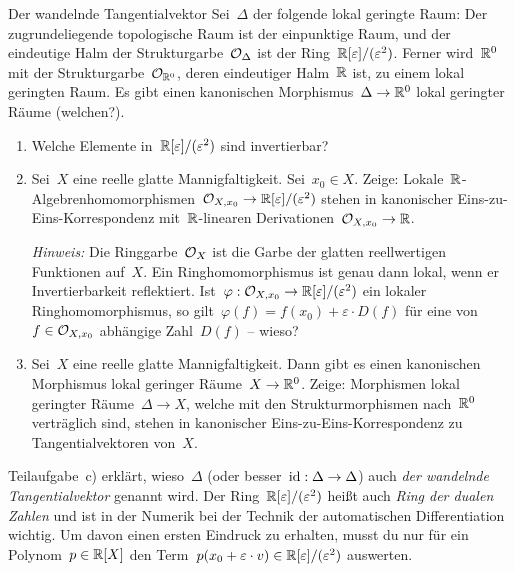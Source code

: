 \documentclass{uebblatt}
\newcommand{\dualnumbers}{\ensuremath{\RR[\varepsilon]/(\varepsilon^2)}}
\begin{document}

\begin{aufgabe}{Der wandelnde Tangentialvektor}
Sei~$\Delta$ der folgende lokal geringte Raum: Der zugrundeliegende
topologische Raum ist der einpunktige Raum, und der eindeutige Halm der
Strukturgarbe~$\mathcal{O}_\Delta$ ist der Ring~\dualnumbers.
Ferner wird~$\mathbb{R}^0$ mit der Strukturgarbe~$\mathcal{O}_{\mathbb{R}^0}$, deren eindeutiger
Halm~$\mathbb{R}$ ist, zu einem lokal geringten Raum. Es gibt einen kanonischen
Morphismus~$\Delta \to \mathbb{R}^0$ lokal geringter Räume (welchen?).

\begin{enumerate}
\item Welche Elemente in~\dualnumbers{} sind invertierbar?
\item Sei~$X$ eine reelle glatte Mannigfaltigkeit. Sei~$x_0 \in X$. Zeige:
Lokale~$\mathbb{R}$-Al\-geb\-ren\-ho\-mo\-mor\-phis\-men~$\O_{X,x_0} \to \dualnumbers$ stehen in
kanonischer Eins-zu-Eins-Korrespondenz mit~$\mathbb{R}$-linearen Derivationen~$\mathcal{O}_{X,x_0} \to \mathbb{R}$.

\emph{Hinweis:} Die Ringgarbe~$\mathcal{O}_X$ ist die Garbe der glatten reellwertigen
Funktionen auf~$X$. Ein Ringhomomorphismus ist genau dann lokal, wenn er
Invertierbarkeit reflektiert. Ist~$\varphi : \O_{X,x_0} \to \dualnumbers$ ein
lokaler Ringhomomorphismus, so gilt~$\varphi(f) = f(x_0) + \varepsilon \cdot
D(f)$ für eine von~$f \in \mathcal{O}_{X,x_0}$ abhängige Zahl~$D(f)$ -- wieso?
\item Sei~$X$ eine reelle glatte Mannigfaltigkeit. Dann gibt es einen
kanonischen Morphismus lokal geringer Räume~$X \to \mathbb{R}^0$. Zeige: Morphismen
lokal geringter Räume~$\Delta \to X$, welche mit den Strukturmorphismen
nach~$\mathbb{R}^0$ verträglich sind, stehen in kanonischer Eins-zu-Eins-Korrespondenz
zu Tangentialvektoren von~$X$.
\end{enumerate}

Teilaufgabe~c) erklärt, wieso~$\Delta$ (oder besser~$\mathrm{id} : \Delta \to \Delta$)
auch \emph{der wandelnde Tangentialvektor} genannt wird. Der
Ring~$\dualnumbers$ heißt auch \emph{Ring der dualen Zahlen} und ist in der
Numerik bei der Technik der automatischen Differentiation wichtig. Um davon
einen ersten Eindruck zu erhalten, musst du nur für ein Polynom~$p \in \mathbb{R}[X]$
den Term~$p(x_0 + \varepsilon \cdot v) \in \dualnumbers$ auswerten.
\end{aufgabe}
\end{document}

